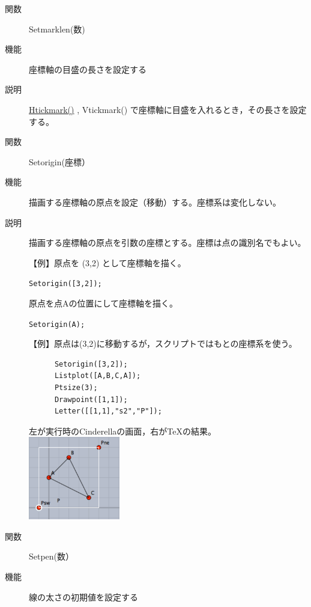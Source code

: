\documentclass[papersize,a4paper,12pt,uplatex]{jsarticle}
\begin{document}
\begin{description}
\hypertarget{setmarklen}{}
\item[関数]  Setmarklen(数)  
\item[機能]  座標軸の目盛の長さを設定する
\item[説明]   \hyperlink{htickmark}{Htickmark()} , Vtickmark() で座標軸に目盛を入れるとき，その長さを設定する。 

\vspace{\baselineskip}
\hypertarget{setorigin}{}
\item[関数]  Setorigin(座標）      
\item[機能]  描画する座標軸の原点を設定（移動）する。座標系は変化しない。
\item[説明]  描画する座標軸の原点を引数の座標とする。座標は点の識別名でもよい。

\vspace{\baselineskip}
【例】原点を (3,2) として座標軸を描く。

\hspace{10mm}  \verb|Setorigin([3,2]);|

原点を点Aの位置にして座標軸を描く。

\hspace{10mm}  \verb|Setorigin(A);|  

\vspace{\baselineskip}
  【例】原点は(3,2)に移動するが，スクリプトではもとの座標系を使う。
\begin{verbatim}
      Setorigin([3,2]);
      Listplot([A,B,C,A]);
      Ptsize(3);
      Drawpoint([1,1]);
      Letter([[1,1],"s2","P"]);
\end{verbatim}
  左が実行時のCinderellaの画面，右が\TeX の結果。\\

\hspace{10mm} \includegraphics[bb=0 0 227 205 , width=4cm]{Fig/setorigin.pdf}      

\vspace{\baselineskip}
\hypertarget{setpen}{}
\item[関数]  Setpen(数）      
\item[機能]  線の太さの初期値を設定する


\end{description}
\end{document}

